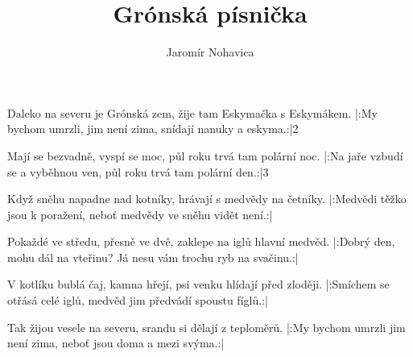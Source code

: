\beginsong

\title{Grónská písnička}
\author{Jaromír Nohavica}

\beginverse
Daleko na severu je Grónská zem,
žije tam Eskymačka s Eskymákem.
|:My bychom umrzli, jim není zima,
snídají nanuky a eskyma.:|{2}
\endverse

\beginverse
Mají se bezvadně, vyspí se moc,
půl roku trvá tam polární noc.
|:Na jaře vzbudí se a vyběhnou ven,
půl roku trvá tam polární den.:|3
\endverse

\beginverse
Když sněhu napadne nad kotníky,
hrávají s medvědy na četníky.
|:Medvědi těžko jsou k poražení,
neboť medvědy ve sněhu vidět není.:|{}
\endverse

\beginverse
Pokaždé ve středu, přesně ve dvě,
zaklepe na iglů hlavní medvěd.
|:Dobrý den, mohu dál na vteřinu?
Já nesu vám trochu ryb na svačinu.:|{}
\endverse

\beginverse
V kotlíku bublá čaj, kamna hřejí,
psi venku hlídají před zloději.
|:Smíchem se otřásá celé iglů,
medvěd jim předvádí spoustu fíglů.:|{}
\endverse

\beginverse
Tak žijou vesele na severu,
srandu si dělají z teploměrů.
|:My bychom umrzli jim není zima,
neboť jsou doma a mezi svýma.:|{}
\endverse


